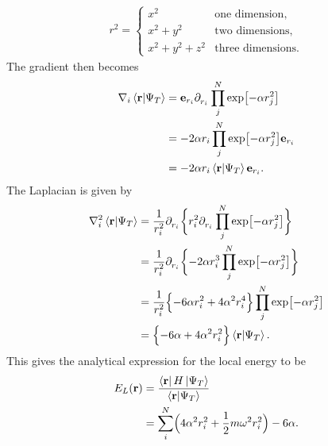 \documentclass[
    a4paper, aps, twocolumn, floatfix, superscriptaddress]{revtex4-1}
\newcommand{\vf}{\mathbf}
\newcommand{\1}{\mathds{1}}
\newcommand{\tpl}[1]{\tensor{\partial}{_#1}} %
\newcommand{\half}{\frac{1}{2}}
\begin{document}
            \begin{align}
                r^2 =
                \begin{cases}
                    x^2 & \text{one dimension}, \\
                    x^2 + y^2 & \text{two dimensions}, \\
                    x^2 + y^2 + z^2 & \text{three dimensions}.
                \end{cases}
            \end{align}
            The gradient then becomes
            \begin{align}
                \nabla_i\bra{\vf{r}}\ket{\Psi_T}
                &= \vf{e}_{{r_i}}\tpl{{r_i}}\prod_j^N\exp\bigl[
                    -\alpha r_j^2
                \bigr] \\
                &=
                -2\alpha r_i\prod_j^N\exp\bigl[
                    -\alpha r_j^2
                \bigr]\vf{e}_{{r_i}} \\
                &=
                -2\alpha r_i\bra{\vf{r}}\ket{\Psi_T}\vf{e}_{{r_i}}.
            \end{align}
            The Laplacian is given by
            \begin{align}
                \nabla_i^2\bra{\vf{r}}\ket{\Psi_T}
                &= \frac{1}{r_i^2}\tpl{{r_i}}
                \biggl\{
                    r_i^2\tpl{{r_i}}
                    \prod_j^N\exp\bigl[
                        -\alpha r_j^2
                    \bigr]
                \biggr\} \\
                &=
                \frac{1}{r_i^2}\tpl{{r_i}}
                \biggl\{
                    -2 \alpha r_i^3
                    \prod_j^N\exp\bigl[
                        -\alpha r_j^2
                    \bigr]
                \biggr\} \\
                &=
                \frac{1}{r_i^2}
                \Bigl\{
                    -6 \alpha r_i^2
                    + 4\alpha^2 r_i^4
                \Bigr\}
                \prod_j^N\exp\bigl[
                    -\alpha r_j^2
                \bigr]
                \\
                &=
                \Bigl\{
                    -6 \alpha
                    + 4\alpha^2 r_i^2
                \Bigr\}
                \bra{\vf{r}}\ket{\Psi_T}.
            \end{align}
            This gives the analytical expression for the local energy to be
            \begin{align}
                E_L(\vf{r})
                &= \frac{\bra{\vf{r}}H\ket{\Psi_T}}{\bra{\vf{r}}\ket{\Psi_T}} \\
                &= \sum_i^N \Bigl(
                    4\alpha^2 r_i^2
                    + \half m \omega^2 r_i^2
                \Bigr) - 6\alpha.
            \end{align}
\end{document}

